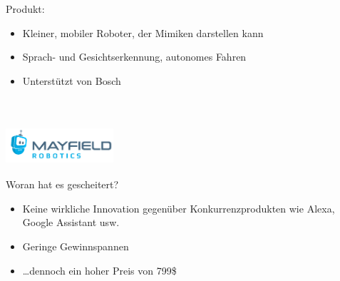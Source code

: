 \documentclass{beamer}
\begin{document}
\begin{frame}
    Produkt: \\
    \begin{itemize}
        \item<1-> Kleiner, mobiler Roboter, der Mimiken darstellen kann
        \item<2-> Sprach- und Gesichtserkennung, autonomes Fahren
        \item<3-> Unterstützt von Bosch
    \end{itemize} ~\\
\end{frame}

\begin{frame}
    \frametitle{\includegraphics[width=0.3\textwidth]{mayfield.png}}
    Woran hat es gescheitert? \\
    \begin{itemize}
        \item<1-> Keine wirkliche Innovation gegenüber Konkurrenzprodukten wie Alexa, Google Assistant usw.
        \item<2-> Geringe Gewinnspannen
        \item<3-> \dots dennoch ein hoher Preis von 799\$
    \end{itemize} ~\\
\end{frame}
\end{document}

